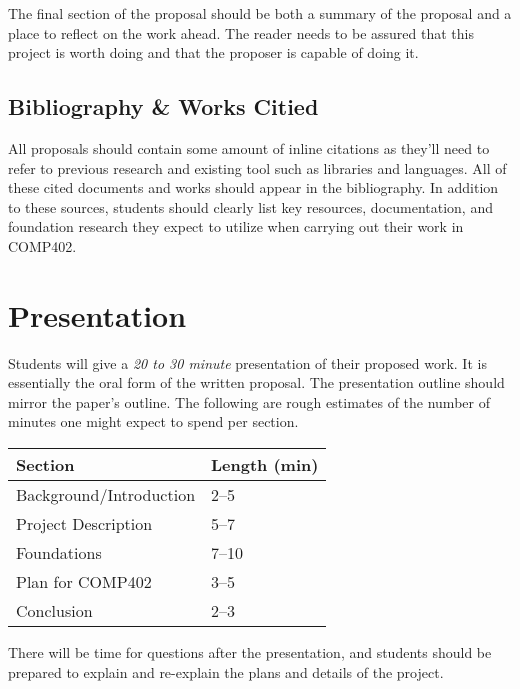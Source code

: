 \documentclass[10pt]{article}
\begin{document}
The final section of the proposal should be both a summary of the proposal and a place to reflect on the work ahead. The reader needs to be assured that this project is worth doing and that the proposer is capable of doing it.


\subsection{Bibliography \& Works Citied}

All proposals should contain some amount of inline citations as they'll need to refer to previous research and existing tool such as libraries and languages. All of these cited documents and works should appear in the bibliography. In addition to these sources, students should clearly list key resources, documentation, and foundation research they expect to utilize when carrying out their work in COMP402.

\section{Presentation}

Students will give a \textit{20 to 30 minute} presentation of their proposed work. It is essentially the oral form of the written proposal. The presentation outline should mirror the paper's outline. The following are rough estimates of the number of minutes one might expect to spend per section.
\begin{center}
  \begin{tabular}{ll}
    Section & Length (min) \\ \toprule
    Background/Introduction & 2--5 \\
    Project Description & 5--7 \\
    Foundations & 7--10 \\
    Plan for COMP402 & 3--5 \\
    Conclusion & 2--3
  \end{tabular}
\end{center}

There will be time for questions after the presentation, and students should be prepared to explain and re-explain the plans and details of the project.
\end{document}
